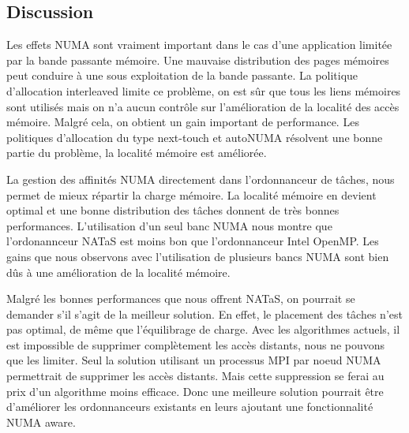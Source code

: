 \subsection{Discussion}
Les effets NUMA sont vraiment important dans le cas d'une application limitée par la bande passante mémoire.
%
Une mauvaise distribution des pages mémoires peut conduire à une sous exploitation de la bande passante.
%
La politique d'allocation interleaved limite ce problème, on est sûr que tous les liens mémoires sont utilisés mais on n'a aucun contrôle sur l'amélioration de la localité des accès mémoire.
%
Malgré cela, on obtient un gain important de performance.
%
Les politiques d'allocation du type next-touch et autoNUMA résolvent une bonne partie du problème, la localité mémoire est améliorée.



La gestion des affinités NUMA directement dans l'ordonnanceur de tâches, nous permet de mieux répartir la charge mémoire.
%
La localité mémoire en devient optimal et une bonne distribution des tâches donnent de très bonnes performances.
%
L'utilisation d'un seul banc NUMA nous montre que l'ordonannceur NATaS est moins bon que l'ordonnanceur Intel OpenMP.
%
Les gains que nous observons avec l'utilisation de plusieurs bancs NUMA sont bien dûs à une amélioration de la localité mémoire.


Malgré les bonnes performances que nous offrent NATaS, on pourrait se demander s'il s'agit de la meilleur solution.
%
En effet, le placement des tâches n'est pas optimal, de même que l'équilibrage de charge.
%
Avec les algorithmes actuels, il est impossible de supprimer complètement les accès distants, nous ne pouvons que les limiter.
%
Seul la solution utilisant un processus MPI par noeud NUMA permettrait de supprimer les accès distants.
%
Mais cette suppression se ferai au prix d'un algorithme moins efficace.
%
Donc une meilleure solution pourrait être d'améliorer les ordonnanceurs existants en leurs ajoutant une fonctionnalité NUMA aware.
